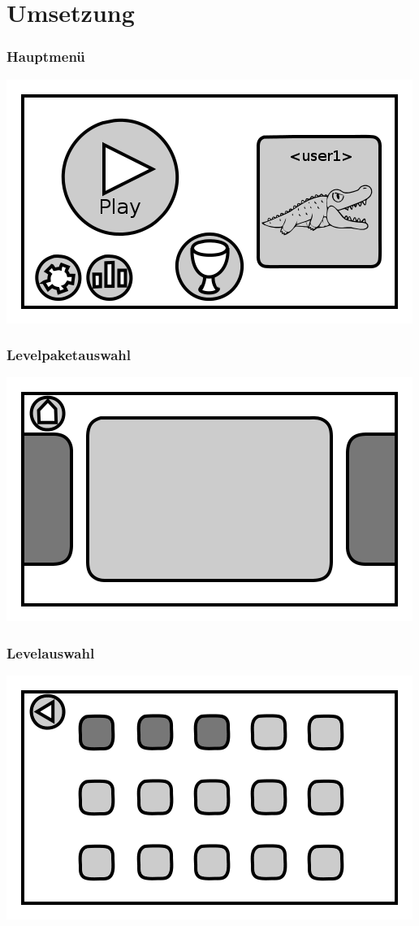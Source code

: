 \documentclass[t]{beamer}
\begin{document}
\section{Umsetzung}
\begin{frame}
	\frametitle{Hauptmenü}
	\includegraphics[height=\textheight]{main_menu.png}
\end{frame}
\begin{frame}
	\frametitle{Levelpaketauswahl}
	\includegraphics[height=\textheight]{level_overview.png}
\end{frame}
\begin{frame}
	\frametitle{Levelauswahl}
	\includegraphics[height=\textheight]{level_overview_detail.png}
\end{frame}
\end{document}

